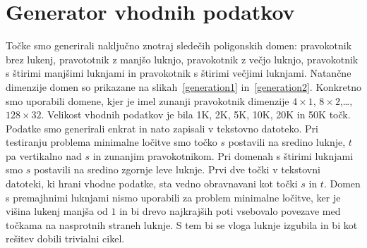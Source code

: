 \documentclass[a4paper, 12pt]{book}
\begin{document}
\section{Generator vhodnih podatkov}

Točke smo generirali naključno znotraj sledečih poligonskih domen: pravokotnik brez lukenj, pravototnik z manjšo luknjo, pravokotnik z večjo luknjo, pravokotnik s štirimi manjšimi luknjami in pravokotnik s štirimi večjimi luknjami. Natančne dimenzije domen so prikazane na slikah~\ref{generation1} in~\ref{generation2}. Konkretno smo uporabili domene, kjer je imel zunanji pravokotnik dimenzije $4\times 1$, $8\times 2$,\ldots, $128\times 32$. Velikost vhodnih podatkov je bila 1K, 2K, 5K, 10K, 20K in 50K točk. Podatke smo generirali enkrat in nato zapisali v tekstovno datoteko. Pri testiranju problema minimalne ločitve smo točko $s$ postavili na sredino luknje, $t$ pa vertikalno nad $s$ in zunanjim pravokotnikom. Pri domenah s štirimi luknjami smo $s$ postavili na sredino zgornje leve luknje. Prvi dve točki v tekstovni datoteki, ki hrani vhodne podatke, sta vedno obravnavani kot točki $s$ in $t$. Domen s premajhnimi luknjami nismo uporabili za problem minimalne ločitve, ker je višina lukenj manjša od $1$ in bi drevo najkrajših poti vsebovalo povezave med točkama na nasprotnih straneh luknje. S tem bi se vloga luknje izgubila in bi kot rešitev dobili trivialni cikel.
\end{document}
